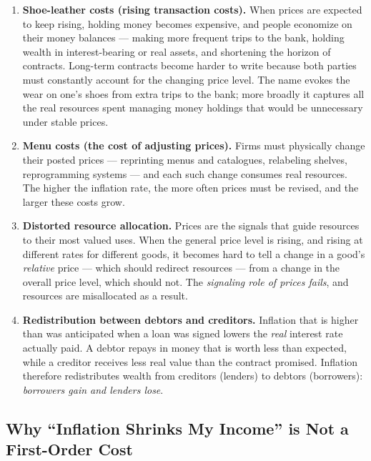 \begin{enumerate}
    \item \textbf{Shoe-leather costs (rising transaction costs).} When prices are expected to keep rising, holding money becomes expensive, and people economize on their money balances --- making more frequent trips to the bank, holding wealth in interest-bearing or real assets, and shortening the horizon of contracts. Long-term contracts become harder to write because both parties must constantly account for the changing price level. The name evokes the wear on one's shoes from extra trips to the bank; more broadly it captures all the real resources spent managing money holdings that would be unnecessary under stable prices.

    \item \textbf{Menu costs (the cost of adjusting prices).} Firms must physically change their posted prices --- reprinting menus and catalogues, relabeling shelves, reprogramming systems --- and each such change consumes real resources. The higher the inflation rate, the more often prices must be revised, and the larger these costs grow.

    \item \textbf{Distorted resource allocation.} Prices are the signals that guide resources to their most valued uses. When the general price level is rising, and rising at different rates for different goods, it becomes hard to tell a change in a good's \emph{relative} price --- which should redirect resources --- from a change in the overall price level, which should not. The \emph{signaling role of prices fails}, and resources are misallocated as a result.

    \item \textbf{Redistribution between debtors and creditors.} Inflation that is higher than was anticipated when a loan was signed lowers the \emph{real} interest rate actually paid. A debtor repays in money that is worth less than expected, while a creditor receives less real value than the contract promised. Inflation therefore redistributes wealth from creditors (lenders) to debtors (borrowers): \emph{borrowers gain and lenders lose}.
\end{enumerate}

\subsection{Why ``Inflation Shrinks My Income'' is Not a First-Order Cost}

